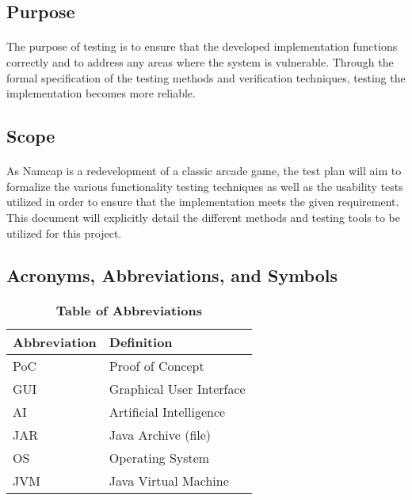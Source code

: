\documentclass[12pt, titlepage]{article}
\begin{document}
\subsection{Purpose}
\paragraph{}
The purpose of testing is to ensure that the developed implementation functions correctly and to address any areas where the system is vulnerable. Through the formal specification of the testing methods and verification techniques, testing the implementation becomes more reliable.

\subsection{Scope}
\paragraph{}
As Namcap is a redevelopment of a classic arcade game, the test plan will aim to formalize the various functionality testing techniques as well as the usability tests utilized in order to ensure that the implementation meets the given requirement. This document will explicitly detail the different methods and testing tools to be utilized for this project.

\subsection{Acronyms, Abbreviations, and Symbols}
	
\begin{table}[hbp]
\caption{\textbf{Table of Abbreviations}} \label{Table}

\begin{tabularx}{\textwidth}{p{3cm}X}
\toprule
\textbf{Abbreviation} & \textbf{Definition} \\
\midrule
PoC & Proof of Concept\\
GUI & Graphical User Interface\\
AI & Artificial Intelligence\\
JAR & Java Archive (file)\\
OS & Operating System\\
JVM & Java Virtual Machine\\
\bottomrule
\end{tabularx}

\end{table}
\end{document}
